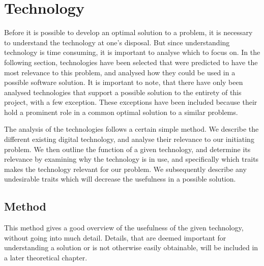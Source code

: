 
\section{Technology} \label{tech}


Before it is possible to develop an optimal solution to a problem, it is necessary to understand the technology at one's disposal. But since understanding technology is time consuming, it is important to analyse which to focus on. In the following section, technologies have been selected that were predicted to have the most relevance to this problem, and analysed how they could be used in a possible software solution. It is important to note, that there have only been analysed technologies that support a possible solution to the entirety of this project, with a few exception. These exceptions have been included because their hold a prominent role in a common optimal solution to a similar problems.

The analysis of the technologies follows a certain simple method. We describe the different existing digital technology, and analyse their relevance to our initiating problem. We then outline the function of a given technology, and determine its relevance by examining why the technology is in use, and specifically which traits makes the technology relevant for our problem. We subsequently describe any undesirable traits which will decrease the usefulness in a possible solution.

\subsection{Method} \label{sub:techmethod}
This method gives a good overview of the usefulness of the given technology, without going into much detail. Details, that are deemed important for understanding a solution or is not otherwise easily obtainable, will be included in a later theoretical chapter.


